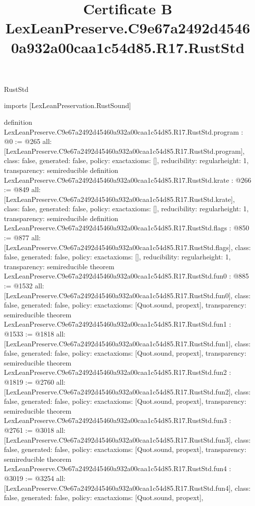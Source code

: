 \begin{lexlean}{RustStd}
\title{Certificate B LexLeanPreserve.C9e67a2492d45460a932a00caa1c54d85.R17.RustStd}
\begin{coremodule}
imports [LexLeanPreservation.RustSound]

definition LexLeanPreserve.C9e67a2492d45460a932a00caa1c54d85.R17.RustStd.program : @0 := @265 {
  all: [LexLeanPreserve.C9e67a2492d45460a932a00caa1c54d85.R17.RustStd.program],
  class: false,
  generated: false,
  policy: exact{axioms: []},
  reducibility: regular{height: 1},
  transparency: semireducible
}
definition LexLeanPreserve.C9e67a2492d45460a932a00caa1c54d85.R17.RustStd.krate : @266 := @849 {
  all: [LexLeanPreserve.C9e67a2492d45460a932a00caa1c54d85.R17.RustStd.krate],
  class: false,
  generated: false,
  policy: exact{axioms: []},
  reducibility: regular{height: 1},
  transparency: semireducible
}
definition LexLeanPreserve.C9e67a2492d45460a932a00caa1c54d85.R17.RustStd.flags : @850 := @877 {
  all: [LexLeanPreserve.C9e67a2492d45460a932a00caa1c54d85.R17.RustStd.flags],
  class: false,
  generated: false,
  policy: exact{axioms: []},
  reducibility: regular{height: 1},
  transparency: semireducible
}
theorem LexLeanPreserve.C9e67a2492d45460a932a00caa1c54d85.R17.RustStd.fun0 : @885 := @1532 {
  all: [LexLeanPreserve.C9e67a2492d45460a932a00caa1c54d85.R17.RustStd.fun0],
  class: false,
  generated: false,
  policy: exact{axioms: [Quot.sound, propext]},
  transparency: semireducible
}
theorem LexLeanPreserve.C9e67a2492d45460a932a00caa1c54d85.R17.RustStd.fun1 : @1533 := @1818 {
  all: [LexLeanPreserve.C9e67a2492d45460a932a00caa1c54d85.R17.RustStd.fun1],
  class: false,
  generated: false,
  policy: exact{axioms: [Quot.sound, propext]},
  transparency: semireducible
}
theorem LexLeanPreserve.C9e67a2492d45460a932a00caa1c54d85.R17.RustStd.fun2 : @1819 := @2760 {
  all: [LexLeanPreserve.C9e67a2492d45460a932a00caa1c54d85.R17.RustStd.fun2],
  class: false,
  generated: false,
  policy: exact{axioms: [Quot.sound, propext]},
  transparency: semireducible
}
theorem LexLeanPreserve.C9e67a2492d45460a932a00caa1c54d85.R17.RustStd.fun3 : @2761 := @3018 {
  all: [LexLeanPreserve.C9e67a2492d45460a932a00caa1c54d85.R17.RustStd.fun3],
  class: false,
  generated: false,
  policy: exact{axioms: [Quot.sound, propext]},
  transparency: semireducible
}
theorem LexLeanPreserve.C9e67a2492d45460a932a00caa1c54d85.R17.RustStd.fun4 : @3019 := @3254 {
  all: [LexLeanPreserve.C9e67a2492d45460a932a00caa1c54d85.R17.RustStd.fun4],
  class: false,
  generated: false,
  policy: exact{axioms: [Quot.sound, propext]},
}
\end{coremodule}
\end{lexlean}
